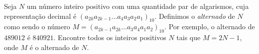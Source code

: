 Seja $N$ um número inteiro positivo com uma quantidade par de algarismos, cuja representação decimal é $(a_{2k}a_{2k-1}\dots a_{4}a_{3}a_{2}a_{1})_{10}$.
Definimos o \textit{alternado} de $N$ como sendo o número $M = (a_{2k-1}a_{2k}\dots a_3a_4a_1a_2)_{10}$.
Por exemplo, o alternado de $489012$ é $840921$.
Encontre todos os inteiros positivos $N$ tais que $M = 2N - 1$, onde $M$ é o alternado de $N$.
